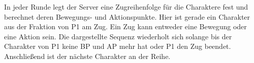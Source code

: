 In jeder Runde legt der Server eine Zugreihenfolge für die Charaktere fest und berechnet deren Bewegungs- und Aktionspunkte. Hier ist gerade ein Charakter aus der Fraktion von P1 am Zug. Ein Zug kann entweder eine Bewegung oder eine Aktion sein. Die dargestellte Sequenz wiederholt sich solange bis der Charakter von P1 keine BP und AP mehr hat oder P1 den Zug beendet. Anschließend ist der nächste Charakter an der Reihe.\\

